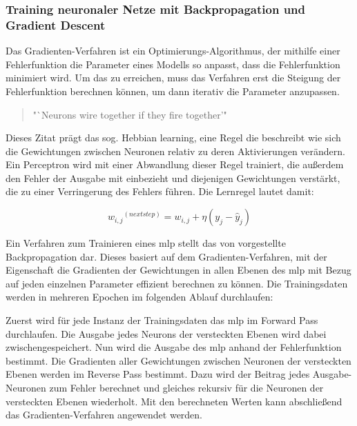 \subsubsection{Training neuronaler Netze mit Backpropagation und Gradient Descent}
\label{chap:Training neuronaler Netze mit Backpropagation und Gradient Descent}

Das Gradienten-Verfahren ist ein Optimierungs-Algorithmus, der mithilfe einer Fehlerfunktion die Parameter eines Modells so anpasst, dass die Fehlerfunktion minimiert wird. Um das zu erreichen, muss das Verfahren erst die Steigung der Fehlerfunktion berechnen können, um dann iterativ die Parameter anzupassen. \cite[vgl. S. 118]{Geron2019}

\begin{quote}
  "`Neurons wire together if they fire together'" \cite{Lowel1992}
\end{quote}

Dieses Zitat prägt das sog. Hebbian learning, eine Regel die beschreibt wie sich die Gewichtungen zwischen Neuronen relativ zu deren Aktivierungen verändern. Ein Perceptron wird mit einer Abwandlung dieser Regel trainiert, die außerdem den Fehler der Ausgabe mit einbezieht und diejenigen Gewichtungen verstärkt, die zu einer Verringerung des Fehlers führen. \cite[vgl. S. 289 ff.]{Geron2019} Die Lernregel lautet damit:

\[{w_{i,j}}^{(next step)}=w_{i,j}+\eta(y_j-\hat{y}_j)\]

Ein Verfahren zum Trainieren eines \ac{mlp} stellt das von \cite{Rumelhart1986} vorgestellte Backpropagation dar. Dieses basiert auf dem Gradienten-Verfahren, mit der Eigenschaft die Gradienten der Gewichtungen in allen Ebenen des \ac{mlp} mit Bezug auf jeden einzelnen Parameter effizient berechnen zu können. Die Trainingsdaten werden in mehreren Epochen im folgenden Ablauf durchlaufen:

Zuerst wird für jede Instanz der Trainingsdaten das \ac{mlp} im Forward Pass durchlaufen. Die Ausgabe jedes Neurons der versteckten Ebenen wird dabei zwischengespeichert. Nun wird die Ausgabe des \ac{mlp} anhand der Fehlerfunktion bestimmt. Die Gradienten aller Gewichtungen zwischen Neuronen der versteckten Ebenen werden im Reverse Pass bestimmt. Dazu wird der Beitrag jedes Ausgabe-Neuronen zum Fehler berechnet und gleiches rekursiv für die Neuronen der versteckten Ebenen wiederholt. Mit den berechneten Werten kann abschließend das Gradienten-Verfahren angewendet werden. \cite[S. 286]{Geron2019}
